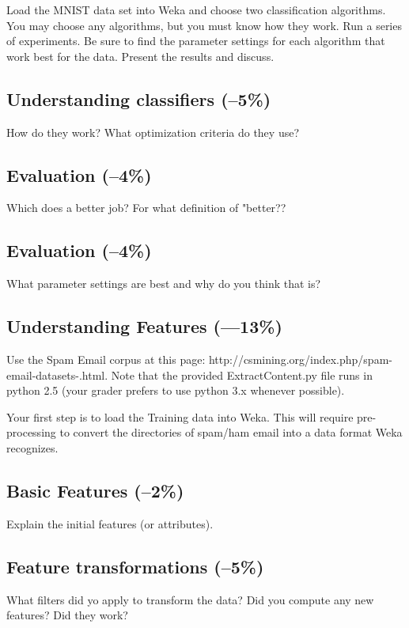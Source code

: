 \documentclass[12pt]{article}
\begin{document}
Load the MNIST data set into Weka and choose two classification algorithms. You may choose any algorithms, but you must know how they work. Run a series of experiments. Be sure to find the parameter settings for each algorithm that work best for the data. Present the results and discuss.

\subsection{Understanding classifiers \rm(--5\%)}
How do they work? What optimization criteria do they use? 

\subsection{Evaluation \rm(--4\%)}
Which does a better job? For what definition of "better??

\subsection{Evaluation \rm(--4\%)}
What parameter settings are best and why do you think that is?



\subsection{Understanding Features \rm(---13\%)}
Use the Spam Email corpus at this page: http://csmining.org/index.php/spam-email-datasets-.html. Note that the provided ExtractContent.py file runs in python 2.5 (your grader prefers to use python 3.x whenever possible).

Your first step is to load the Training data into Weka. This will require pre-processing to convert the directories of spam/ham email into a data format Weka recognizes.
\subsection{Basic Features \rm(--2\%)}
Explain the initial features (or attributes). 

\subsection{Feature transformations \rm(--5\%)}
What filters did yo apply to transform the data? Did you compute any new features? Did they work?
\end{document}
